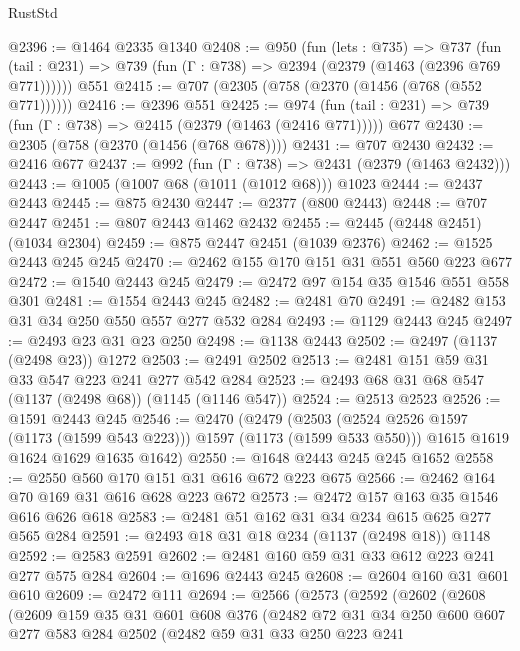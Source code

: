 \begin{lexlean}{RustStd}
\begin{coremodule}
@2396 := @1464 @2335 @1340
@2408 := @950
    (fun (lets : @735) =>
    @737 (fun (tail : @231) => @739 (fun (Γ : @738) => @2394 (@2379 (@1463 (@2396 @769 @771))))))
    @551
@2415 := @707 (@2305 (@758 (@2370 (@1456 (@768 (@552 @771))))))
@2416 := @2396 @551
@2425 := @974
    (fun (tail : @231) => @739 (fun (Γ : @738) => @2415 (@2379 (@1463 (@2416 @771)))))
    @677
@2430 := @2305 (@758 (@2370 (@1456 (@768 @678))))
@2431 := @707 @2430
@2432 := @2416 @677
@2437 := @992 (fun (Γ : @738) => @2431 (@2379 (@1463 @2432)))
@2443 := @1005 (@1007 @68 (@1011 (@1012 @68))) @1023
@2444 := @2437 @2443
@2445 := @875 @2430
@2447 := @2377 (@800 @2443)
@2448 := @707 @2447
@2451 := @807 @2443 @1462 @2432
@2455 := @2445 (@2448 @2451) (@1034 @2304)
@2459 := @875 @2447 @2451 (@1039 @2376)
@2462 := @1525 @2443 @245 @245
@2470 := @2462 @155 @170 @151 @31 @551 @560 @223 @677
@2472 := @1540 @2443 @245
@2479 := @2472 @97 @154 @35 @1546 @551 @558 @301
@2481 := @1554 @2443 @245
@2482 := @2481 @70
@2491 := @2482 @153 @31 @34 @250 @550 @557 @277 @532 @284
@2493 := @1129 @2443 @245
@2497 := @2493 @23 @31 @23 @250
@2498 := @1138 @2443
@2502 := @2497 (@1137 (@2498 @23)) @1272
@2503 := @2491 @2502
@2513 := @2481 @151 @59 @31 @33 @547 @223 @241 @277 @542 @284
@2523 := @2493 @68 @31 @68 @547 (@1137 (@2498 @68)) (@1145 (@1146 @547))
@2524 := @2513 @2523
@2526 := @1591 @2443 @245
@2546 := @2470
    (@2479
      (@2503 (@2524 @2526 @1597 (@1173 (@1599 @543 @223))) @1597 (@1173 (@1599 @533 @550)))
      @1615
      @1619
      @1624
      @1629
      @1635
      @1642)
@2550 := @1648 @2443 @245 @245 @1652
@2558 := @2550 @560 @170 @151 @31 @616 @672 @223 @675
@2566 := @2462 @164 @70 @169 @31 @616 @628 @223 @672
@2573 := @2472 @157 @163 @35 @1546 @616 @626 @618
@2583 := @2481 @51 @162 @31 @34 @234 @615 @625 @277 @565 @284
@2591 := @2493 @18 @31 @18 @234 (@1137 (@2498 @18)) @1148
@2592 := @2583 @2591
@2602 := @2481 @160 @59 @31 @33 @612 @223 @241 @277 @575 @284
@2604 := @1696 @2443 @245
@2608 := @2604 @160 @31 @601 @610
@2609 := @2472 @111
@2694 := @2566
    (@2573
      (@2592
        (@2602
          (@2608
            (@2609
              @159
              @35
              @31
              @601
              @608
              @376
              (@2482
                @72
                @31
                @34
                @250
                @600
                @607
                @277
                @583
                @284
                @2502
                (@2482
                  @59
                  @31
                  @33
                  @250
                  @223
                  @241

\end{coremodule}
\end{lexlean}
